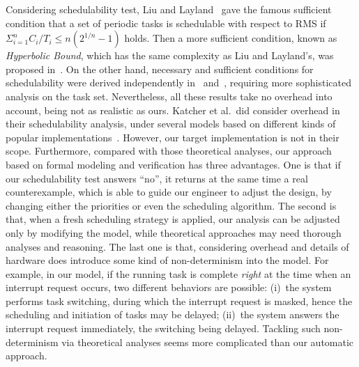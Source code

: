 \documentclass[journal]{IEEEtranTIE}
\begin{document}
Considering schedulability test, Liu and
Layland~\cite{DBLP:journals/jacm/LiuL73} gave the famous sufficient
condition that a set of periodic tasks is schedulable with respect to
RMS if $\Sigma^n_{i=1} C_i/T_i \le n(2^{1/n}-1)$ holds. Then a more
sufficient condition, known as \emph{Hyperbolic Bound}, which has the
same complexity as Liu and Layland's, was proposed
in~\cite{DBLP:journals/tc/BiniBB03}. On the other hand, necessary and
sufficient conditions for schedulability were derived independently
in~\cite{DBLP:journals/rts/SpruntSL89} and~\cite{audsley1993deadline},
requiring more sophisticated analysis on the task set. Nevertheless,
all these results take no overhead into account, being not as
realistic as ours. Katcher et al.\ did consider overhead in their
schedulability analysis, under several models based on different kinds
of popular implementations~\cite{DBLP:journals/tse/KatcherAS93}.
However, our target implementation is not in their scope. Furthermore,
compared with those theoretical analyses, our approach based on formal
modeling and verification has three advantages. One is that if our
schedulability test answers ``no'', it returns at the same time a real
counterexample, which is able to guide our engineer to adjust the
design, by changing either the priorities or even the scheduling
algorithm. The second is that, when a fresh scheduling strategy is
applied, our analysis can be adjusted only by modifying the model,
while theoretical approaches may need thorough analyses and reasoning.
The last one is that, considering overhead and details of hardware
does introduce some kind of non-determinism into the model. For
example, in our model, if the running task is complete \emph{right} at
the time when an interrupt request occurs, two different behaviors are
possible: (i)~the system performs task switching, during which the
interrupt request is masked, hence the scheduling and initiation of
tasks may be delayed; (ii)~the system answers the interrupt request
immediately, the switching being delayed. Tackling such
non-determinism via theoretical analyses seems more complicated than
our automatic approach.
\end{document}
